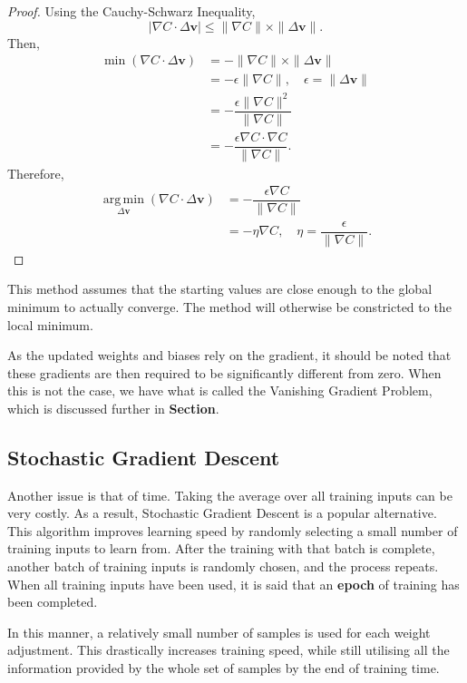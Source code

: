 \documentclass[honours,12pt]{unswthesis}
\numberwithin{equation}{section}
\begin{document}
\begin{proof}
	Using the Cauchy-Schwarz Inequality,
	\[
			|\nabla C\cdot\Delta\mathbf{v}| \le \|\nabla C\|\times\|\Delta\mathbf{v}\|.
	\]
	Then, \begin{align*}
		\min(\nabla C\cdot\Delta\mathbf{v}) & = -\|\nabla C\|\times\|\Delta\mathbf{v}\| \\
		& = -\epsilon\|\nabla C\|,\quad\epsilon = \|\Delta\mathbf{v}\| \\
		& = -\dfrac{\epsilon\|\nabla C\|^2}{\|\nabla C\|} \\
		& = -\dfrac{\epsilon\nabla C\cdot\nabla C}{\|\nabla C\|}.
	\end{align*}
	Therefore,
	\begin{align*}
		\operatorname*{arg\,min}_{\Delta\mathbf{v}}(\nabla C\cdot\Delta\mathbf{v}) & = -\dfrac{\epsilon\nabla C}{\|\nabla C\|} \\
		& = -\eta\nabla C,\quad\eta = \dfrac{\epsilon}{\|\nabla C\|}.
	\end{align*}
\end{proof}


This method assumes that the starting values are close enough to the global minimum to actually converge. The method will otherwise be constricted to the local minimum.

As the updated weights and biases rely on the gradient, it should be noted that these gradients are then required to be significantly different from zero. When this is not the case, we have what is called the Vanishing Gradient Problem, which is discussed further in \textbf{Section}.

\subsection{Stochastic Gradient Descent}\label{nnets-stochgraddesc}

Another issue is that of time. Taking the average over all training inputs can be very costly. As a result, Stochastic Gradient Descent is a popular alternative. This algorithm improves learning speed by randomly selecting a small number of training inputs to learn from. After the training with that batch is complete, another batch of training inputs is randomly chosen, and the process repeats. When all training inputs have been used, it is said that an \textbf{epoch} of training has been completed.

In this manner, a relatively small number of samples is used for each weight adjustment. This drastically increases training speed, while still utilising all the information provided by the whole set of samples by the end of training time.
\end{document}
